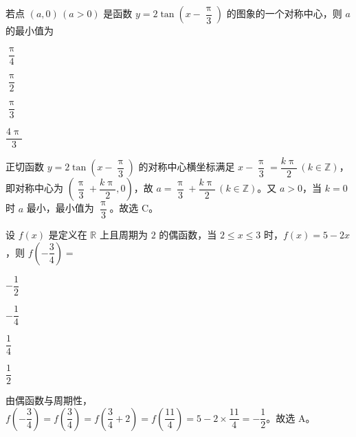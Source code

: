 \documentclass{exam-zh}
\begin{document}
\begin{question}
若点 $(a,0)\,(a>0)$ 是函数 $y=2\tan\left(x-\dfrac{\uppi}{3}\right)$ 的图象的一个对称中心，则 $a$ 的最小值为 \paren[C]
\begin{choices}
  \item $\dfrac{\uppi}{4}$
  \item $\dfrac{\uppi}{2}$
  \item $\dfrac{\uppi}{3}$
  \item $\dfrac{4\uppi}{3}$
\end{choices}
\begin{solution}
正切函数 $y=2\tan\left(x-\dfrac{\uppi}{3}\right)$ 的对称中心横坐标满足 $x-\dfrac{\uppi}{3}=\dfrac{k\uppi}{2}\,(k\in\mathbb{Z})$，即对称中心为 $\left(\dfrac{\uppi}{3}+\dfrac{k\uppi}{2},0\right)$，故 $a=\dfrac{\uppi}{3}+\dfrac{k\uppi}{2}\,(k\in\mathbb{Z})$。又 $a>0$，当 $k=0$ 时 $a$ 最小，最小值为 $\dfrac{\uppi}{3}$。故选 C。
\end{solution}
\end{question}

\begin{question}
设 $f(x)$ 是定义在 $\mathbb{R}$ 上且周期为 $2$ 的偶函数，当 $2\le x\le 3$ 时，$f(x)=5-2x$，则 $f\left(-\dfrac{3}{4}\right)=$ \paren[A]
\begin{choices}
  \item $-\dfrac{1}{2}$
  \item $-\dfrac{1}{4}$
  \item $\dfrac{1}{4}$
  \item $\dfrac{1}{2}$
\end{choices}
\begin{solution}
由偶函数与周期性，$f\left(-\dfrac{3}{4}\right)=f\left(\dfrac{3}{4}\right)=f\left(\dfrac{3}{4}+2\right)=f\left(\dfrac{11}{4}\right)=5-2\times\dfrac{11}{4}=-\dfrac{1}{2}$。故选 A。
\end{solution}
\end{question}
\end{document}
